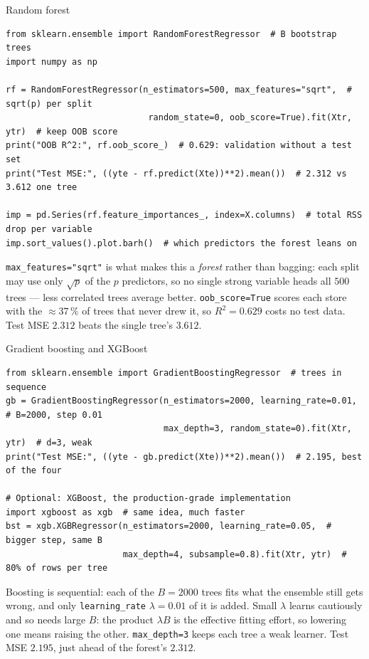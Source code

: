 \documentclass[aspectratio=169,11pt]{beamer}
\begin{document}
\begin{frame}[fragile]{Random forest}
  \begin{lstlisting}[basicstyle=\ttfamily\scriptsize]
from sklearn.ensemble import RandomForestRegressor  # B bootstrap trees
import numpy as np

rf = RandomForestRegressor(n_estimators=500, max_features="sqrt",  # sqrt(p) per split
                            random_state=0, oob_score=True).fit(Xtr, ytr)  # keep OOB score
print("OOB R^2:", rf.oob_score_)  # 0.629: validation without a test set
print("Test MSE:", ((yte - rf.predict(Xte))**2).mean())  # 2.312 vs 3.612 one tree

imp = pd.Series(rf.feature_importances_, index=X.columns)  # total RSS drop per variable
imp.sort_values().plot.barh()  # which predictors the forest leans on
  \end{lstlisting}
  \begin{readme}
    \texttt{max\_features="sqrt"} is what makes this a \emph{forest} rather
    than bagging: each split may use only $\sqrt p$ of the $p$ predictors, so
    no single strong variable heads all $500$ trees --- less correlated trees
    average better. \texttt{oob\_score=True} scores each store with the
    ${\approx}37\,\%$ of trees that never drew it, so $R^2=0.629$ costs no
    test data. Test MSE $2.312$ beats the single tree's $3.612$.
  \end{readme}
\end{frame}

\begin{frame}[fragile]{Gradient boosting and XGBoost}
  \begin{lstlisting}[basicstyle=\ttfamily\scriptsize]
from sklearn.ensemble import GradientBoostingRegressor  # trees in sequence
gb = GradientBoostingRegressor(n_estimators=2000, learning_rate=0.01,  # B=2000, step 0.01
                               max_depth=3, random_state=0).fit(Xtr, ytr)  # d=3, weak
print("Test MSE:", ((yte - gb.predict(Xte))**2).mean())  # 2.195, best of the four

# Optional: XGBoost, the production-grade implementation
import xgboost as xgb  # same idea, much faster
bst = xgb.XGBRegressor(n_estimators=2000, learning_rate=0.05,  # bigger step, same B
                       max_depth=4, subsample=0.8).fit(Xtr, ytr)  # 80% of rows per tree
  \end{lstlisting}
  \begin{readme}
    Boosting is sequential: each of the $B=2000$ trees fits what the ensemble
    still gets wrong, and only \texttt{learning\_rate} $\lambda=0.01$ of it is
    added. Small $\lambda$ learns cautiously and so needs large $B$: the
    product $\lambda B$ is the effective fitting effort, so lowering one means
    raising the other. \texttt{max\_depth=3} keeps each tree a weak learner.
    Test MSE $2.195$, just ahead of the forest's $2.312$.
  \end{readme}
\end{frame}
\end{document}

